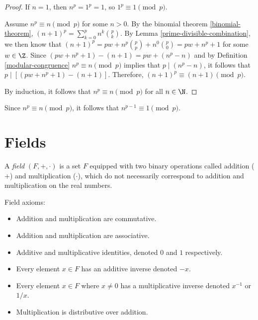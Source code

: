\documentclass[12pt]{article}
\begin{document}
\begin{proof}
    If $n = 1$, then $n^p = 1^p = 1$, so $1^p \equiv 1 \pmod p$.

    Assume $n^p \equiv n \pmod p$ for some $n > 0$. By the binomial theorem \ref{binomial-theorem}, $(n+1)^p = \sum_{k=0}^pn^k{p \choose k}$. By Lemma \ref{prime-divisible-combination}, we then know that $(n+1)^p = pw + n^p{p \choose p} + n^0{p \choose 0} = pw + n^p + 1$ for some $w \in \Z$. Since $(pw + n^p + 1) - (n + 1) = pw + (n^p - n)$ and by Definition \ref{modular-congruence} $n^p \equiv n \pmod p$ implies that $p \mid (n^p - n)$, it follows that $p \mid \left[(pw + n^p + 1) - (n + 1)\right]$. Therefore, $(n+1)^p \equiv (n+1) \pmod p$.

    By induction, it follows that $n^p \equiv n \pmod p$ for all $n \in \N$.
\end{proof}

\begin{cor}\label{fermat-little-corallary}
    Since $n^p \equiv n \pmod p$, it follows that $n^{p-1} \equiv 1 \pmod p$.
\end{cor}

\section{Fields}

\begin{defn}
    A \emph{field} $(F, +, \cdot)$ is a set $F$ equipped with two binary operations called addition ($+$) and multiplication ($\cdot$), which do not necessarily correspond to addition and multiplication on the real numbers.

    Field axioms:
    \begin{itemize}
        \item Addition and multiplication are commutative.
        \item Addition and multiplication are associative.
        \item Additive and multiplicative identities, denoted $0$ and $1$ respectively.
        \item Every element $x \in F$ has an additive inverse denoted $-x$.
        \item Every element $x \in F$ where $x \neq 0$ has a multiplicative inverse denoted $x^{-1}$ or $1/x$.
        \item Multiplication is distributive over addition.
    \end{itemize}
\end{defn}
\end{document}
